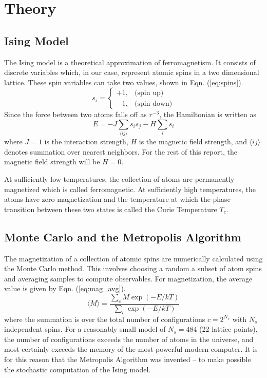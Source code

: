 \documentclass[12pt,oneside,a4paper]{article}
\begin{document}
\section{Theory}

\subsection{Ising Model}

The Ising model is a theoretical approximation of ferromagnetism.  It consists of discrete variables which, in our case, represent atomic spins in a two dimensional lattice.  These spin variables can take two values, shown in Eqn. (\ref{eq:spins}).
\begin{equation}
s_i =
\left\{
	\begin{array}{ll}
		+1, & \text{(spin up)} \\
		-1,  & \text{(spin down)}
	\end{array}
\right.
\label{eq:spins}
\end{equation}
Since the force between two atoms falls off as $r^{-3}$, the Hamiltonian is written as
\begin{equation}
E = -J\sum\limits_{\langle ij\rangle} s_i s_j - H\sum\limits_i s_i
\end{equation}
where $J=1$ is the interaction strength, $H$ is the magnetic field strength, and $\langle ij\rangle$ denotes summation over nearest neighbors.  For the rest of this report, the magnetic field strength will be $H=0$. 

At sufficiently low temperatures, the collection of atoms are permanently magnetized which is called ferromagnetic.  At sufficiently high temperatures, the atoms have zero magnetization and the temperature at which the phase transition between these two states is called the Curie Temperature $T_c$.

\subsection{Monte Carlo and the Metropolis Algorithm}

The magnetization of a collection of atomic spins are numerically calculated using the Monte Carlo method.  This involves choosing a random a subset of atom spins and averaging samples to compute observables.  For magnetization, the average value is given by Eqn. (\ref{eq:mag_avg}).
\begin{equation}
\langle M \rangle = \frac{\sum\limits_c M \exp\left(-E/kT\right)}{\sum\limits_c \exp\left(-E/kT\right)}
\label{eq:mag_avg}
\end{equation}
where the summation is over the total number of configurations $c = 2^{N_s}$ with $N_s$ independent spins.  For a reasonably small model of $N_s = 484$ (22 lattice points), the number of configurations exceeds the number of atoms in the universe, and most certainly exceeds the memory of the most powerful modern computer.  It is for this reason that the Metropolis Algorithm was invented -- to make possible the stochastic computation of the Ising model.
\end{document}
